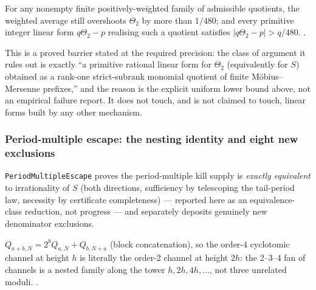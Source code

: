 \begin{prop}
For any nonempty finite positively-weighted family of admissible quotients,
the weighted average still overshoots $\Theta_2$ by more than $1/480$; and
every primitive integer linear form $q\Theta_2 - p$ realising such a
quotient satisfies $|q\Theta_2 - p| > q/480$.
\quad {}
\quad {} \quad {} \quad {}.
\end{prop}

\begin{obs}
This is a proved barrier stated at the required precision: the class of
argument it rules out is exactly ``a primitive rational linear form for
$\Theta_2$ (equivalently for $S$) obtained as a rank-one strict-subrank
monomial quotient of finite Möbius--Mersenne prefixes,'' and the reason is
the explicit uniform lower bound above, not an empirical failure report.
It does not touch, and is not claimed to touch, linear forms built by any
other mechanism.
\end{obs}

\subsubsection{Period-multiple escape: the nesting identity and eight new exclusions}

\texttt{PeriodMultipleEscape} proves the period-multiple kill supply is
\emph{exactly equivalent} to irrationality of $S$ (both directions,
sufficiency by telescoping the tail-period law, necessity by certificate
completeness) --- reported here as an equivalence-class reduction, not
progress --- and separately deposits genuinely new denominator exclusions.

\begin{thm}
$Q_{a+b,N} = 2^b Q_{a,N} + Q_{b,N+a}$ (block concatenation), so the order-4
cyclotomic channel at height $h$ is literally the order-2 channel at height
$2h$: the 2--3--4 fan of channels is a nested family along the tower
$h,2h,4h,\dots$, not three unrelated moduli.
\quad {}
\quad {} \quad {} \quad {}.
\end{thm}

